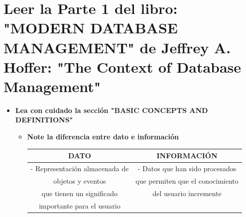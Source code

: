 \documentclass[letterpaper,12pt]{article}
\begin{document}
\begin{sloppypar}
\section*{Leer la Parte 1 del libro: "MODERN DATABASE MANAGEMENT" de Jeffrey A. Hoffer: "The Context of Database Management"}
\begin{itemize}
    \item \textbf{Lea con cuidado la sección "BASIC CONCEPTS AND DEFINITIONS" }
    \begin{itemize}
        \item \textbf{Note la diferencia entre dato e información}
        \begin{center}
                \begin{tabular}[H]{|c|c|} \hline 
                \textbf{DATO} & \textbf{INFORMACIÓN} \\ \hline  
                - Representación almacenada de & - Datos que han sido procesados\\
                objetos y eventos & que permiten que el conocimiento \\
                que tienen un significado & del usuario incremente \\
                importante para el usuario & \\ \hline
                \end{tabular}   
        \end{center}


\end{itemize}
\end{itemize}
\end{sloppypar}
\end{document}
